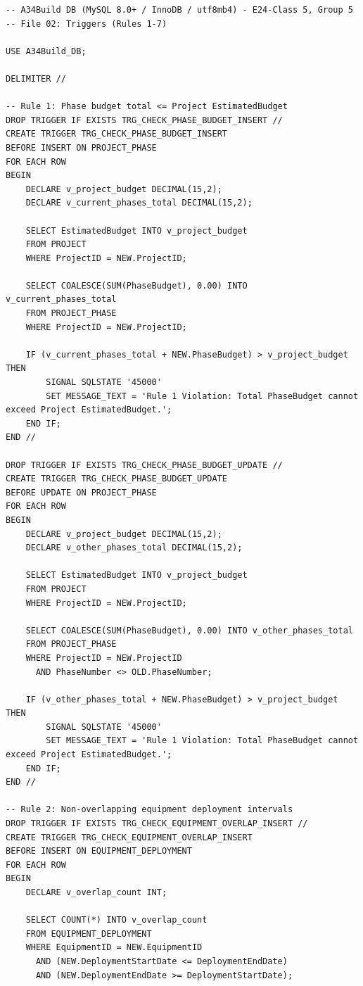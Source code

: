 \documentclass[a4paper,12pt]{report}
\begin{document}
\begin{lstlisting}
-- A34Build DB (MySQL 8.0+ / InnoDB / utf8mb4) - E24-Class 5, Group 5
-- File 02: Triggers (Rules 1-7)

USE A34Build_DB;

DELIMITER //

-- Rule 1: Phase budget total <= Project EstimatedBudget
DROP TRIGGER IF EXISTS TRG_CHECK_PHASE_BUDGET_INSERT //
CREATE TRIGGER TRG_CHECK_PHASE_BUDGET_INSERT
BEFORE INSERT ON PROJECT_PHASE
FOR EACH ROW
BEGIN
    DECLARE v_project_budget DECIMAL(15,2);
    DECLARE v_current_phases_total DECIMAL(15,2);

    SELECT EstimatedBudget INTO v_project_budget
    FROM PROJECT
    WHERE ProjectID = NEW.ProjectID;

    SELECT COALESCE(SUM(PhaseBudget), 0.00) INTO v_current_phases_total
    FROM PROJECT_PHASE
    WHERE ProjectID = NEW.ProjectID;

    IF (v_current_phases_total + NEW.PhaseBudget) > v_project_budget THEN
        SIGNAL SQLSTATE '45000'
        SET MESSAGE_TEXT = 'Rule 1 Violation: Total PhaseBudget cannot exceed Project EstimatedBudget.';
    END IF;
END //

DROP TRIGGER IF EXISTS TRG_CHECK_PHASE_BUDGET_UPDATE //
CREATE TRIGGER TRG_CHECK_PHASE_BUDGET_UPDATE
BEFORE UPDATE ON PROJECT_PHASE
FOR EACH ROW
BEGIN
    DECLARE v_project_budget DECIMAL(15,2);
    DECLARE v_other_phases_total DECIMAL(15,2);

    SELECT EstimatedBudget INTO v_project_budget
    FROM PROJECT
    WHERE ProjectID = NEW.ProjectID;

    SELECT COALESCE(SUM(PhaseBudget), 0.00) INTO v_other_phases_total
    FROM PROJECT_PHASE
    WHERE ProjectID = NEW.ProjectID
      AND PhaseNumber <> OLD.PhaseNumber;

    IF (v_other_phases_total + NEW.PhaseBudget) > v_project_budget THEN
        SIGNAL SQLSTATE '45000'
        SET MESSAGE_TEXT = 'Rule 1 Violation: Total PhaseBudget cannot exceed Project EstimatedBudget.';
    END IF;
END //

-- Rule 2: Non-overlapping equipment deployment intervals
DROP TRIGGER IF EXISTS TRG_CHECK_EQUIPMENT_OVERLAP_INSERT //
CREATE TRIGGER TRG_CHECK_EQUIPMENT_OVERLAP_INSERT
BEFORE INSERT ON EQUIPMENT_DEPLOYMENT
FOR EACH ROW
BEGIN
    DECLARE v_overlap_count INT;

    SELECT COUNT(*) INTO v_overlap_count
    FROM EQUIPMENT_DEPLOYMENT
    WHERE EquipmentID = NEW.EquipmentID
      AND (NEW.DeploymentStartDate <= DeploymentEndDate)
      AND (NEW.DeploymentEndDate >= DeploymentStartDate);


\end{lstlisting}
\end{document}
